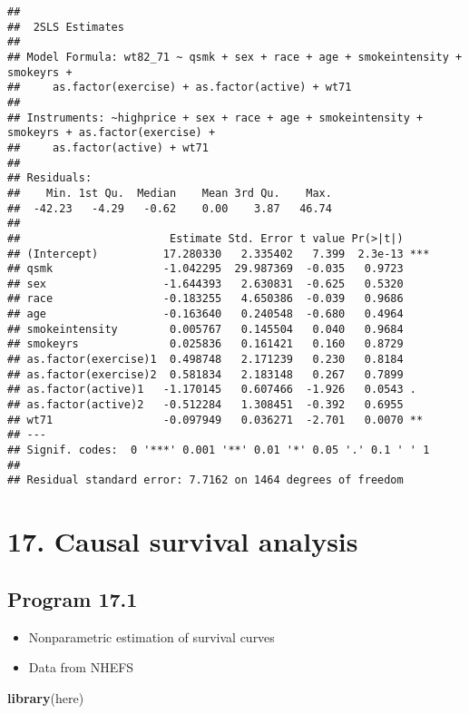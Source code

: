 \documentclass[10pt,]{book}
\newenvironment{Shaded}{\begin{snugshade}}{\end{snugshade}}
\newcommand{\KeywordTok}[1]{\textcolor[rgb]{0.13,0.29,0.53}{\textbf{#1}}}
\newcommand{\NormalTok}[1]{#1}
\providecommand{\tightlist}{%
  \setlength{\itemsep}{0pt}\setlength{\parskip}{0pt}}
\begin{document}
\begin{verbatim}
## 
##  2SLS Estimates
## 
## Model Formula: wt82_71 ~ qsmk + sex + race + age + smokeintensity + smokeyrs + 
##     as.factor(exercise) + as.factor(active) + wt71
## 
## Instruments: ~highprice + sex + race + age + smokeintensity + smokeyrs + as.factor(exercise) + 
##     as.factor(active) + wt71
## 
## Residuals:
##    Min. 1st Qu.  Median    Mean 3rd Qu.    Max. 
##  -42.23   -4.29   -0.62    0.00    3.87   46.74 
## 
##                       Estimate Std. Error t value Pr(>|t|)    
## (Intercept)          17.280330   2.335402   7.399  2.3e-13 ***
## qsmk                 -1.042295  29.987369  -0.035   0.9723    
## sex                  -1.644393   2.630831  -0.625   0.5320    
## race                 -0.183255   4.650386  -0.039   0.9686    
## age                  -0.163640   0.240548  -0.680   0.4964    
## smokeintensity        0.005767   0.145504   0.040   0.9684    
## smokeyrs              0.025836   0.161421   0.160   0.8729    
## as.factor(exercise)1  0.498748   2.171239   0.230   0.8184    
## as.factor(exercise)2  0.581834   2.183148   0.267   0.7899    
## as.factor(active)1   -1.170145   0.607466  -1.926   0.0543 .  
## as.factor(active)2   -0.512284   1.308451  -0.392   0.6955    
## wt71                 -0.097949   0.036271  -2.701   0.0070 ** 
## ---
## Signif. codes:  0 '***' 0.001 '**' 0.01 '*' 0.05 '.' 0.1 ' ' 1
## 
## Residual standard error: 7.7162 on 1464 degrees of freedom
\end{verbatim}

\hypertarget{causal-survival-analysis}{%
\chapter*{17. Causal survival analysis}\label{causal-survival-analysis}}

\hypertarget{program-17.1}{%
\section{Program 17.1}\label{program-17.1}}

\begin{itemize}
\tightlist
\item
  Nonparametric estimation of survival curves
\item
  Data from NHEFS
\end{itemize}

\begin{Shaded}
\begin{Highlighting}[]
\KeywordTok{library}\NormalTok{(here)}
\end{Highlighting}
\end{Shaded}
\end{document}
